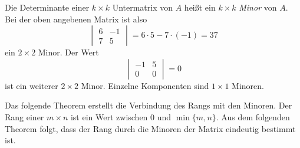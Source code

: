 Die Determinante einer $ k \times k $ Untermatrix von $ A$ heißt ein $ k \times k $ \emph{Minor} von $ A $. Bei der oben angebenen Matrix ist  also
\[
	\begin{vmatrix} 6 & -1 
	\\ 7 & 5 \end{vmatrix}  = 6 \cdot 5 - 7 \cdot (-1) = 37
\]
ein $ 2\times 2$ Minor. Der Wert
\[
	\begin{vmatrix} -1 & 5 \\ 0 & 0 \end{vmatrix} = 0
\]
ist ein weiterer $2 \times 2$ Minor. Einzelne Komponenten sind $1 \times 1$ Minoren. 

Das folgende Theorem erstellt die Verbindung des Rangs mit den Minoren. Der Rang einer $m \times n$ ist ein Wert zwischen $0$ und $\min \{m,n\}$. Aus dem folgenden Theorem folgt, dass der Rang durch die Minoren der Matrix eindeutig bestimmt ist. 

